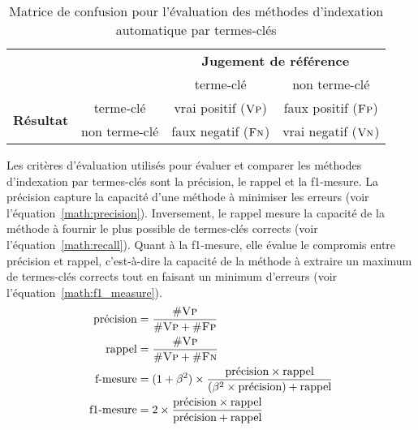     \begin{table}
      \begin{center}
        \begin{tabular}{cc|cc}
          \toprule
          \multicolumn{2}{c|}{} & \multicolumn{2}{c}{\textbf{Jugement de référence}}\\
          \multicolumn{2}{c|}{} & \og{}terme-clé\fg{} & \og{}non terme-clé\fg{}\\
          \hline
          \multirow{2}{*}{\textbf{Résultat}} & \og{}terme-clé\fg{} & vrai positif ($\textsc{Vp}$) & faux positif ($\textsc{Fp}$)\\
          & \og{}non terme-clé\fg{} & faux negatif ($\textsc{Fn}$) & vrai negatif ($\textsc{Vn}$)\\
          \bottomrule
        \end{tabular}
        \caption{Matrice de confusion pour l'évaluation des méthodes
                 d'indexation automatique par termes-clés
                \label{tab:confusion_matrix}}
      \end{center}
    \end{table}

    Les critères d'évaluation utilisés pour évaluer et comparer les méthodes
    d'indexation par termes-clés sont la précision, le rappel et la f1-mesure.
    La précision capture la capacité d'une méthode à minimiser les erreurs (voir
    l'équation~\ref{math:precision}). Inversement, le rappel mesure la capacité de
    la méthode à fournir le plus possible de termes-clés corrects (voir l'équation~\ref{math:recall}). Quant à la f1-mesure, elle évalue le compromis
    entre précision et rappel, c'est-à-dire la capacité de la méthode à extraire
    un maximum de termes-clés corrects tout en faisant un minimum d'erreurs
    (voir l'équation~\ref{math:f1_measure}).
    \begin{align}
      \text{précision} &= \frac{\#\textsc{Vp}}{\#\textsc{Vp} + \#\textsc{Fp}} \label{math:precision}\\
      \text{rappel} &= \frac{\#\textsc{Vp}}{\#\textsc{Vp} + \#\textsc{Fn}} \label{math:recall}\\
      \text{f-mesure} &= (1 + \beta^2) \times \frac{\text{précision} \times \text{rappel}}{(\beta^2 \times \text{précision}) + \text{rappel}} \label{math:f_measure}\\
      \text{f1-mesure} &= 2 \times \frac{\text{précision} \times \text{rappel}}{\text{précision} + \text{rappel}} \label{math:f1_measure}
    \end{align}
      
